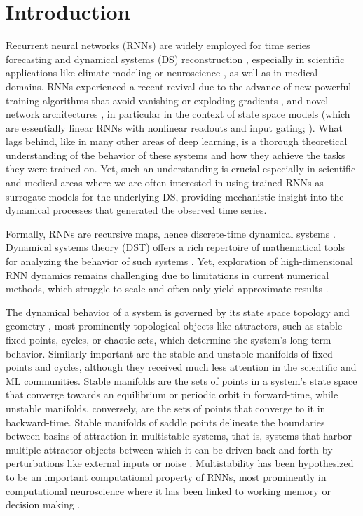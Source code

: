 \documentclass{article}
\theoremstyle{example}
\theoremstyle{plain}
\theoremstyle{definition}
\theoremstyle{remark}
\begin{document}
\section{Introduction}

Recurrent neural networks (RNNs) are widely employed for time series forecasting \citep{Park,gu2023mamba} and dynamical systems (DS) reconstruction \citep{hess,brenner_tractable_2022,brennerintegrating,platt2023constraining}, especially in scientific applications like climate modeling \citep{patel} or neuroscience \citep{durstewitz2023reconstructing}, as well as in medical domains. RNNs experienced a recent revival due to the advance of new powerful training algorithms that avoid vanishing or exploding gradients \citep{hess}, and novel network architectures \citep{sch,rusch2020coupled,peng2023rwkv,gu2023mamba,ruschlong}, in particular in the context of state space models (which are essentially linear RNNs with nonlinear readouts and input gating; \citep{gu2023mamba,orvieto2023resurrecting}). What lags behind, like in many other areas of deep learning, is a thorough theoretical understanding of the behavior of these systems and how they achieve the tasks they were trained on. Yet, such an understanding is crucial especially in scientific and medical areas where we are often interested in using trained RNNs as surrogate models for the underlying DS, providing mechanistic insight into the dynamical processes that generated the observed time series.

Formally, RNNs are recursive maps, hence discrete-time dynamical systems \citep{mikhaeil2021difficulty}. 
Dynamical systems theory (DST) offers a rich repertoire of mathematical tools for analyzing the behavior of such systems \citep{guckenheimer2013nonlinear}. Yet, exploration of high-dimensional RNN dynamics remains challenging due to limitations in current numerical methods, which struggle to scale and often only yield approximate results \citep{katz_using_2018,golub_fixedpointfinder_2018}. 

The dynamical behavior of a system is governed by its state space topology and geometry \citep{hasselblatt2002handbook}, most prominently topological objects like attractors, such as stable fixed points, cycles,
or chaotic sets, which determine the system's %
long-term behavior. Similarly important are the stable and unstable manifolds of fixed points and cycles, although they received much less attention in the scientific and ML communities. Stable manifolds are the sets of points in a system's state space that converge towards an equilibrium or periodic orbit in forward-time, while unstable manifolds, conversely, are the sets of points that converge to it in backward-time. %
Stable manifolds of saddle points delineate the boundaries between basins of attraction in multistable systems, that is, systems that harbor multiple attractor objects between which it can be driven back and forth by perturbations like external inputs or noise \citep{feu18}. Multistability has been hypothesized to be an important computational property of RNNs, most prominently in computational neuroscience where it has been linked to working memory \citep{dur0} or decision making \citep{wang2008decision}. 
\end{document}
